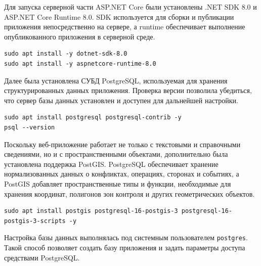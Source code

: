 Для запуска серверной части ASP.NET Core были установлены .NET SDK 8.0 и ASP.NET Core Runtime 8.0. SDK используется для сборки и публикации приложения непосредственно на сервере, а runtime обеспечивает выполнение опубликованного приложения в серверной среде.

\begin{code}
\vspace{-0.75cm}
\begin{verbatim}
sudo apt install -y dotnet-sdk-8.0
sudo apt install -y aspnetcore-runtime-8.0
\end{verbatim}
\end{code}

Далее была установлена СУБД PostgreSQL, используемая для хранения структурированных данных приложения. Проверка версии позволила убедиться, что сервер базы данных установлен и доступен для дальнейшей настройки.

\begin{code}
\vspace{-0.75cm}
\begin{verbatim}
sudo apt install postgresql postgresql-contrib -y
psql --version
\end{verbatim}
\end{code}

Поскольку веб-приложение работает не только с текстовыми и справочными сведениями, но и с пространственными объектами, дополнительно была установлена поддержка PostGIS. PostgreSQL обеспечивает хранение нормализованных данных о конфликтах, операциях, сторонах и событиях, а PostGIS добавляет пространственные типы и функции, необходимые для хранения координат, полигонов зон контроля и других геометрических объектов.

\begin{code}
\vspace{-0.75cm}
\begin{verbatim}
sudo apt install postgis postgresql-16-postgis-3 postgresql-16-postgis-3-scripts -y
\end{verbatim}
\end{code}

Настройка базы данных выполнялась под системным пользователем \texttt{postgres}. Такой способ позволяет создать базу приложения и задать параметры доступа средствами PostgreSQL.

